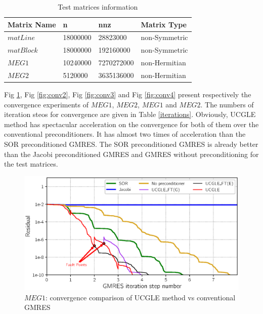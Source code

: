 \begin{table}[!t]
	\renewcommand{\arraystretch}{1.2}
	\caption{Test matrices information}
	\label{matget}
	\centering
	\begin{tabular}{x{4cm}|x{3cm}|x{3cm}|x{4cm}}
		\toprule
			Matrix Name& 	n & 	nnz & 	Matrix Type\\
		\midrule
		$matLine$  & \num[round-precision=2,round-mode=figures]{18000000} & \num[round-precision=2,round-mode=figures]{28823000} & non-Symmetric\\
		\hline
		$matBlock$  & \num[round-precision=2,round-mode=figures]{18000000} & \num[round-precision=2,round-mode=figures]{192160000} & non-Symmetric\\
		\hline
		$MEG1$ & \num[round-precision=4,round-mode=figures]{10240000} & \num[round-mode = places, scientific-notation = fixed, fixed-exponent = 9,round-precision = 2]{7270272000} & non-Hermitian\\
		\hline
		$MEG2$ & \num[round-precision=2,round-mode=figures]{5120000} & \num[round-mode = places, scientific-notation = fixed, fixed-exponent = 9,round-precision = 2]{3635136000} & non-Hermitian\\
		\bottomrule
	\end{tabular}
\end{table}


Fig \ref{fig:conv1}, Fig \ref{fig:conv2}, Fig \ref{fig:conv3} and Fig \ref{fig:conv4} present respectively the convergence experiments of $MEG1$, $MEG2$, $MEG1$ and $MEG2$. The numbers of iteration steos for convergence are given in Table \ref{iterations}. Obviously, UCGLE method has spectacular acceleration on the convergence for both of them over the conventional preconditioners. It has almost two times of acceleration than the SOR preconditioned GMRES. The SOR preconditioned GMRES is already better than the Jacobi preconditioned GMRES and GMRES without preconditioning for the test matrices.

\begin{figure}[htbp]
	\centering
	\includegraphics[width=6.2in]{fig/convergence1.eps}
	\caption{$MEG1$: convergence comparison of UCGLE method vs conventional GMRES}
	\label{fig:conv1}
\end{figure}


